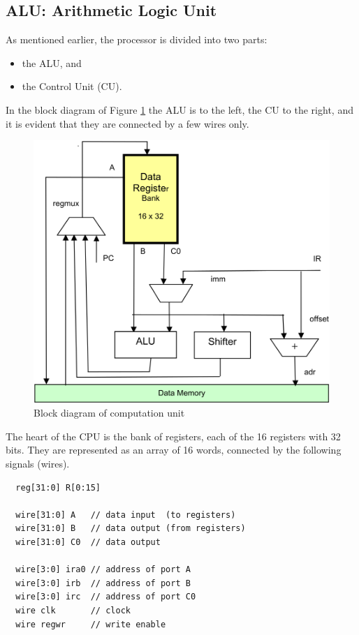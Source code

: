 \subsection{ALU: Arithmetic Logic Unit}
As mentioned earlier, the processor is divided into two parts:
\begin{itemize}
  \item the ALU, and
  \item the Control Unit (CU).
\end{itemize}
In the block diagram of Figure \ref{fig:cpu} the ALU is to the left, the CU to the right, and
it is evident that they are connected by a few wires only.
\begin{figure}[h!]
  \centering
  \includegraphics[width=.9\textwidth]{i/6.png}
  \caption{Block diagram of computation unit}
  \label{fig:cpu}
\end{figure}

The heart of the CPU is the bank of registers, each of the 16 registers with 32 bits. They are
represented as an array of 16 words, connected by the following signals (wires).
\begin{verbatim}
  reg[31:0] R[0:15]
 
  wire[31:0] A   // data input  (to registers)
  wire[31:0] B   // data output (from registers)
  wire[31:0] C0  // data output
 
  wire[3:0] ira0 // address of port A
  wire[3:0] irb  // address of port B
  wire[3:0] irc  // address of port C0
  wire clk       // clock
  wire regwr     // write enable
\end{verbatim}

